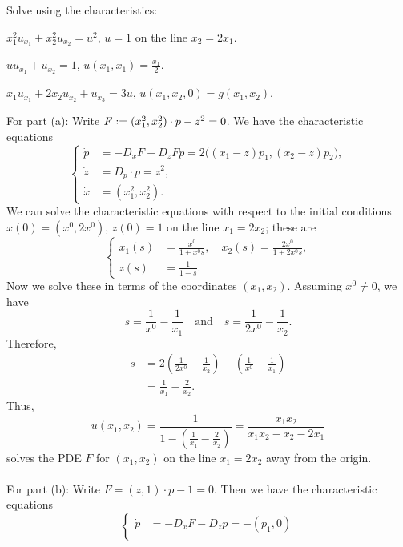 \begin{problem}
  Solve using the characteristics:
  \begin{alphlist}
  \item \(x_1^2u_{x_1}+x_2^2u_{x_2}=u^2\), \(u=1\) on the line
    \(x_2=2x_1\).
  \item \(uu_{x_1}+u_{x_2}=1\), \(u(x_1,x_1)=\frac{x_1}{2}\).
  \item \(x_1u_{x_1}+2x_2u_{x_2}+u_{x_3}=3u\),
    \(u(x_1,x_2,0)=g(x_1,x_2)\).
  \end{alphlist}
\end{problem}
\begin{solution*}
  For part (a): Write \(F\defeq (x_1^2,x_2^2)\cdot p-z^2=0\). We have the
  characteristic equations
  \[
    \left\{
      \begin{aligned}
        \dot p&=-D_xF-D_zFp=2\bigl((x_1-z)p_1,(x_2-z)p_2\bigr),\\
        \dot z&=D_p\cdot p=z^2,\\
        \dot x&=(x_1^2,x_2^2).
      \end{aligned}
    \right.
  \]
  We can solve the characteristic equations with respect to the initial
  conditions \(x(0)=(x^0,2x^0)\), \(z(0)=1\) on the line \(x_1=2x_2\);
  these are
  \[
    \left\{
      \begin{aligned}
        x_1(s)&=\frac{x^0}{1+x^0s},\quad
        x_2(s)=\frac{2x^0}{1+2x^0s},\\
        z(s)&=\frac{1}{1-s}.
      \end{aligned}
    \right.
  \]
  Now we solve these in terms of the coordinates \((x_1,x_2)\). Assuming
  \(x^0\neq 0\), we have
  \[
    s=\frac{1}{x^0}-\frac{1}{x_1}\quad
    \text{and}\quad
    s=\frac{1}{2x^0}-\frac{1}{x_2}.
  \]
  Therefore,
  \begin{align*}
    s
    &=2\left(\frac{1}{2x^0}-\frac{1}{x_2}\right)
      -\left(\frac{1}{x^0}-\frac{1}{x_1}\right)\\
    &=\frac{1}{x_1}-\frac{2}{x_2}.
  \end{align*}
  Thus,
  \[
    u(x_1,x_2)=
    \frac{1}{1-\left(\frac{1}{x_1}-\frac{2}{x_2}\right)}=%
    \frac{x_1x_2}{x_1x_2-x_2-2x_1}
  \]
  solves the PDE \(F\) for \((x_1,x_2)\) on the line \(x_1=2x_2\) away from
  the origin.
  \\\\
  For part (b): Write \(F=(z,1)\cdot p-1=0\).  Then we have the
  characteristic equations
  \[
    \left\{
      \begin{aligned}
        \dot p&=-D_xF-D_z p=-(p_1,0)\\

\end{aligned}\]
\end{solution*}
